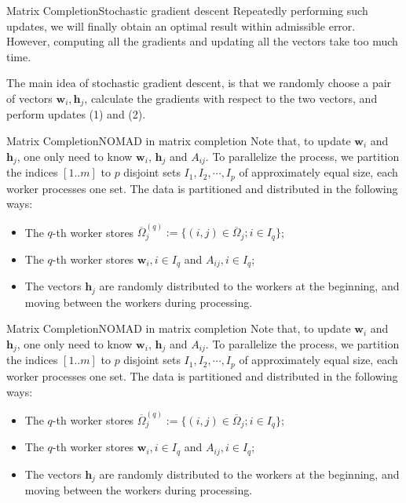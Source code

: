 \documentclass{beamer}
\renewcommand{\vec}{\mathbf}
\begin{document}
  \begin{frame}{Matrix Completion}{Stochastic gradient descent}
    Repeatedly performing such updates, we will finally obtain an optimal result within admissible error. However, computing all the gradients and updating all the vectors take too much time. \par
    The main idea of stochastic gradient descent, is that we randomly choose a pair of vectors $\vec{w}_i, \vec{h}_j$, calculate the gradients with respect to the two vectors, and perform updates (1) and (2).
  \end{frame}

  \begin{frame}{Matrix Completion}{NOMAD in matrix completion}
    Note that, to update $\vec{w}_i$ and $\vec{h}_j$, one only need to know $\vec{w}_i$, $\vec{h}_j$ and $A_{ij}$. To parallelize the process, we partition the indices $[1..m]$ to $p$ disjoint sets $I_1, I_2, \cdots, I_p$ of approximately equal size, each worker processes one set. The data is partitioned and distributed in the following ways:
    \pause
    \begin{itemize}
      \item The $q$-th worker stores $\overline{\Omega}^{(q)}_j := \{(i, j) \in \overline{\Omega}_j; i \in I_q\}$;
      \item The $q$-th worker stores $\vec{w}_i, i \in I_q$ and $A_{ij}, i \in I_q$;
      \item The vectors $\vec{h}_j$ are randomly distributed to the workers at the beginning, and moving between the workers during processing.
    \end{itemize}
  \end{frame}

  \begin{frame}{Matrix Completion}{NOMAD in matrix completion}
    Note that, to update $\vec{w}_i$ and $\vec{h}_j$, one only need to know $\vec{w}_i$, $\vec{h}_j$ and $A_{ij}$. To parallelize the process, we partition the indices $[1..m]$ to $p$ disjoint sets $I_1, I_2, \cdots, I_p$ of approximately equal size, each worker processes one set. The data is partitioned and distributed in the following ways:
    \pause
    \begin{itemize}
      \item The $q$-th worker stores $\overline{\Omega}^{(q)}_j := \{(i, j) \in \overline{\Omega}_j; i \in I_q\}$;
      \item The $q$-th worker stores $\vec{w}_i, i \in I_q$ and $A_{ij}, i \in I_q$;
      \item The vectors $\vec{h}_j$ are randomly distributed to the workers at the beginning, and moving between the workers during processing.
    \end{itemize}
  \end{frame}
\end{document}
